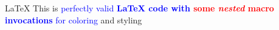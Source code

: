 \usepackage{xcolor}

\newcommand{\tcgreen}[1]{\textcolor{green}{#1}}
\renewcommand{\tcgreen}[1]{\textcolor{green}{#1}}

\newcommand{\tcred}[1]{\textcolor{red}{#1}}
\newcommand{\tcblue}[1]{\textcolor{blue}{#1}}


\begin{testenv}{\LaTeX}
This is \tcblue{perfectly valid \textbf{\LaTeX{} code with \tcred{some \textit{nested}
macro} invocations} for coloring} and styling
\end{testenv}

\code


